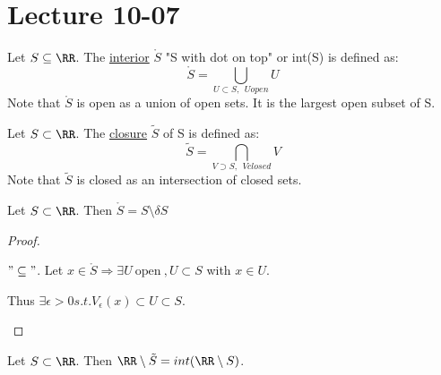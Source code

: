 \documentclass[class=scrartcl, crop=false]{standalone}
\date{2019-10-07}
\begin{document}
\section{Lecture 10-07}

\begin{example}
\end{example}

\begin{definition}
  Let $S \subseteq \RR$. The \ul{interior} $\mathring{S}$ "S with dot on top" or int(S) is defined as:
  $$ \mathring{S} = \bigcup_{U \subset S, \ \ U open}U $$
  Note that $\mathring{S}$ is open as a union of open sets.
  It is the largest open subset of S.
\end{definition}

\begin{definition}
  Let $S \subset \RR$. The \ul{closure} $\tilde{S}$ of S is defined as:
  $$ \tilde{S} = \bigcap_{V \supset S, \ \ V closed} V $$
  Note that $\tilde{S}$ is closed as an intersection of closed sets.
\end{definition}

\begin{theorem}
  Let $S \subset \RR$. Then $\mathring{S} = S \setminus \delta S$
  \begin{proof}
    \begin{enumerate}
      \ii
      $"\subseteq"$. Let $x \in \mathring{S} \Rightarrow \exists U \ \text{open} \ , U \subset S$ with $x \in U$.

      Thus $\exists \epsilon > 0 s.t. V_{\epsilon}(x) \subset U \subset S$.
    \end{enumerate}
  \end{proof}
\end{theorem}

\begin{theorem}
  Let $S \subset \RR$. Then $\RR \setminus \tilde{S} = int(\RR \setminus S)$.
\end{theorem}
\end{document}
